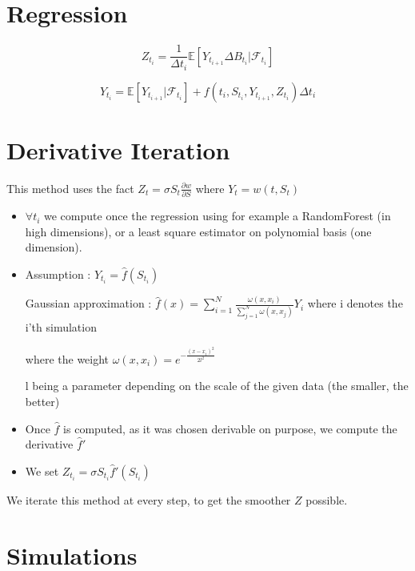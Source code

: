 \documentclass[english,11pt,openany]{article}
\theoremstyle{definition}
\begin{document}
\begin{titlepage}
\section{Regression}

\begin{displaymath}
Z_{t_i} = \frac{1}{\Delta t_i}\mathbb{E}[Y_{t_{i + 1}} \Delta B_{t_i}  | \mathcal{F}_{t_i}]
\end{displaymath}

\begin{displaymath}
Y_{t_i} = \mathbb{E}[Y_{t_{i + 1}} | \mathcal{F}_{t_i}] +  f(t_i,S_{t_i}, Y_{t_{i + 1}}, Z_{t_i})\Delta t_i
\end{displaymath}

\section{Derivative Iteration}

This method uses the fact $Z_t = \sigma S_t \frac{\partial w}{\partial S}$ where $Y_t = w(t, S_t)$

\begin{itemize}
	\item $\forall t_i$ we compute once the regression using for example a RandomForest (in high dimensions), or a least square estimator on polynomial basis (one dimension). 
	
	\item Assumption : $Y_{t_i} = \hat{f}(S_{t_i})$
	
	Gaussian approximation : $\hat{f}(x) = \sum_{i=1}^{N} \frac{\omega(x, x_i)}{\sum_{j=1}^{N}\omega(x, x_j)}Y_i$ where i denotes the i'th simulation
	
	where the weight $\omega(x, x_i) = e^{- \frac{(x - x_i)^2}{2l^2}}$
	
	l being a parameter depending on the scale of the given data (the smaller, the better)
	
	\item Once $\hat{f}$ is computed, as it was chosen derivable on purpose, we compute the derivative $\hat{f}'$
	
	\item We set $Z_{t_i} = \sigma S_{t_i} \hat{f}'(S_{t_i})$
\end{itemize}

We iterate this method at every step, to get the smoother $Z$ possible. 

\section{Simulations}


\end{titlepage}
\end{document}
